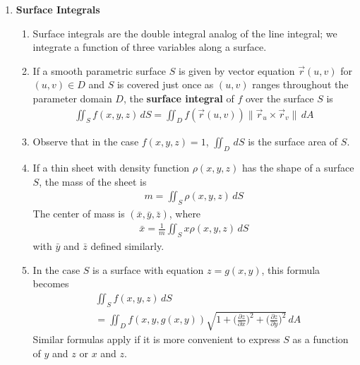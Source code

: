 \documentclass[10pt]{article}
\begin{document}
\begin{multicols*}{2}
\begin{enumerate}
    \item \textbf{Surface Integrals}
    \begin{enumerate}
        \item Surface integrals are the double integral analog of the line integral; we integrate a function of three variables along a surface.
        \item If a smooth parametric surface $S$ is given by vector equation $\vec{r}(u,v)$ for $(u,v) \in D$ and $S$ is covered just once as $(u,v)$ ranges throughout the parameter domain $D$, the \textbf{surface integral} of $f$ over the surface $S$ is
        \begin{align*}
            \iint_S f(x,y,z) \,dS = \iint_D f(\vec{r}(u,v)) \| \vec{r}_u \times \vec{r}_v \| \,dA
        \end{align*}
        \item Observe that in the case $f(x,y,z)=1$, $\iint_D \,dS$ is the surface area of $S$.
        \item If a thin sheet with density function $\rho(x,y,z)$ has the shape of a surface $S$, the mass of the sheet is
        \begin{align*}
            m = \iint_S \rho(x,y,z) \,dS
        \end{align*}
        The center of mass is $(\bar{x}, \bar{y}, \bar{z})$, where
        \begin{align*}
            \bar{x} = \frac{1}{m} \iint_S x\rho(x,y,z) \,dS 
        \end{align*}
        with $\bar{y}$ and $\bar{z}$ defined similarly.
        
        \item In the case $S$ is a surface with equation $z=g(x,y)$, this formula becomes
        \begin{align*}
            &\iint_S f(x,y,z) \,dS  \\ &=\iint_D f(x,y,g(x,y)) \sqrt{1 + \biggl( \frac{\partial z}{\partial x} \biggr)^2 + \biggl( \frac{\partial z}{\partial y} \biggr)^2} \,dA
        \end{align*}
        Similar formulas apply if it is more convenient to express $S$ as a function of $y$ and $z$ or $x$ and $z$. 
        

\end{enumerate}
\end{enumerate}
\end{multicols*}
\end{document}
